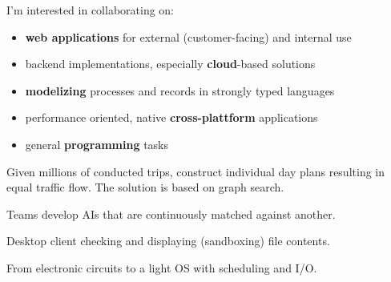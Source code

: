 \documentclass[12pt,a4paper,ragged2e,withhyper]{altacv} %
\begin{document}
\begin{paracol}{2}


I'm interested in collaborating on:
\smallskip
\begin{itemize}
\item \textbf{web applications} for external (customer-facing) and internal use
\item backend implementations, especially \textbf{cloud}-based solutions
\item \textbf{modelizing} processes and records in strongly typed languages
\item performance oriented, native \textbf{cross-plattform} applications
\item general \textbf{programming} tasks
\end{itemize}


\vspace{-4pt}
Given millions of conducted trips,
construct individual day plans resulting in equal traffic flow.
The solution is based on graph search.

\medskip
{}

\medskip
{}    

\divider

\vspace{-4pt}
Teams develop AIs that are continuously matched against another.

\medskip
{}   

\divider

\vspace{-4pt}
Desktop client checking and displaying (sandboxing) file contents.

\medskip
{}     

\divider

\vspace{-4pt}
From electronic circuits to a light OS with scheduling and I/O.


\end{paracol}
\end{document}
